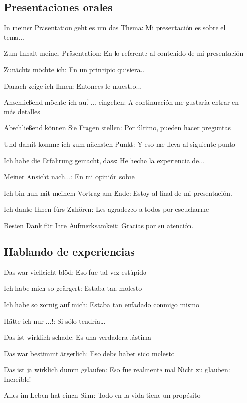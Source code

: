 \subsection{Presentaciones orales}
\begin{myitemize}
\item In meiner Präsentation geht es um das Thema: Mi presentación es sobre el tema...
\item Zum Inhalt meiner Präsentation: En lo referente al contenido de mi presentación
\item Zunächts möchte ich: En un principio quisiera...
\item Danach zeige ich Ihnen: Entonces le muestro...
\item Anschließend möchte ich auf ... eingehen: A continuación me gustaría entrar en más detalles
\item Abschließend können Sie Fragen stellen: Por último, pueden hacer preguntas
\item Und damit komme ich zum nächsten Punkt: Y eso me lleva al siguiente punto
\item Ich habe die Erfahrung gemacht, dass: He hecho la experiencia de... 
\item Meiner Ansicht nach...: En mi opinión sobre
\item Ich bin nun mit meinem Vortrag am Ende: Estoy al final de mi presentación.
\item Ich danke Ihnen fürs Zuhören: Les agradezco a todos por escucharme
\item Besten Dank für Ihre Aufmerksamkeit: Gracias por su atención. 
\end{myitemize}

\subsection{Hablando de experiencias}
\begin{myitemize}
\item Das war vielleicht blöd: Eso fue tal vez estúpido
\item Ich habe mich so geärgert: Estaba tan molesto
\item Ich habe so zornig auf mich: Estaba tan enfadado conmigo mismo
\item Hätte ich nur ...!: Si sólo tendría...
\item Das ist wirklich schade: Es una verdadera lástima
\item Das war bestimmt ärgerlich: Eso debe haber sido molesto
\item Das ist ja wirklich dumm gelaufen: Eso fue realmente mal
\text Nicht zu glauben: Increíble!
\item Alles im Leben hat einen Sinn: Todo en la vida tiene un propósito
\end{myitemize}